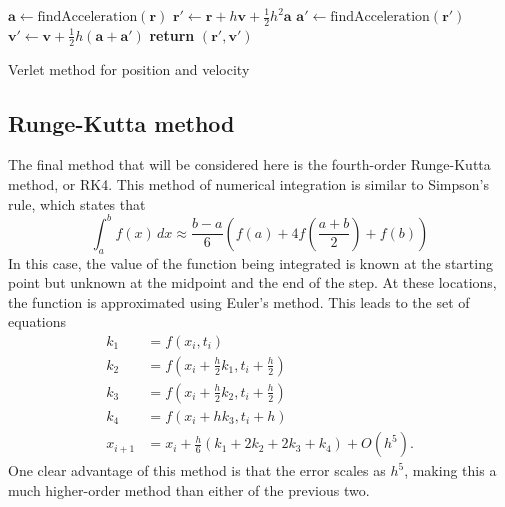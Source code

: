\documentclass[aps,prc,reprint,nobalancelastpage]{revtex4-1}
\begin{document}
            \begin{algorithm}[H]
                \begin{algorithmic}
                        \State $\mathbf{a} \gets \text{findAcceleration}(\mathbf{r})$
                        \State $\mathbf{r}' \gets \mathbf{r} + h \mathbf{v} + \frac{1}{2} h^2 \mathbf{a}$
                        \State $\mathbf{a}' \gets \text{findAcceleration}(\mathbf{r}')$
                        \State $\mathbf{v}' \gets \mathbf{v} + \frac{1}{2} h (\mathbf{a} + \mathbf{a}')$
                        \State \textbf{return} $(\mathbf{r}', \mathbf{v}')$
                    \EndFunction
                \end{algorithmic}
                \caption{Verlet method for position and velocity}
                \label{alg:verlet}
            \end{algorithm}

    \subsection{Runge-Kutta method}
    \label{sub:rk4}

        The final method that will be considered here is the fourth-order Runge-Kutta method, or RK4. This method of numerical integration is similar to Simpson's rule, which states that \cite{Stewart2008}
        \begin{equation*}
            \int_{a}^{b} f(x)\,dx \approx \frac{b-a}{6} \left( f(a) + 4 f\!\left(\frac{a+b}{2}\right) + f(b) \right)
        \end{equation*}
        In this case, the value of the function being integrated is known at the starting point but unknown at the midpoint and the end of the step. At these locations, the function is approximated using Euler's method. This leads to the set of equations \cite{Hjorth-Jensen2016}
        \begin{align}
            k_1     &= f(x_i, t_i) \\
            k_2     &= f(x_i + \tfrac{h}{2} k_1, t_i + \tfrac{h}{2}) \\
            k_3     &= f(x_i + \tfrac{h}{2} k_2, t_i + \tfrac{h}{2}) \\
            k_4     &= f(x_i + h k_3, t_i + h) \\
            x_{i+1} &= x_i + \tfrac{h}{6}(k_1 + 2k_2 + 2k_3 + k_4) + O(h^5).
        \end{align}
        One clear advantage of this method is that the error scales as $h^5$, making this a much higher-order method than either of the previous two. \cite{Hjorth-Jensen2016}
\end{document}

